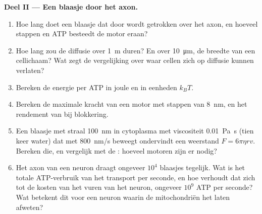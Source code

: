 \begin{problem}
\medskip
\noindent\textbf{Deel II --- Een blaasje door het axon.}
\begin{enumerate}[resume]
  \item Hoe lang doet een blaasje dat door  wordt getrokken over
        het axon, en hoeveel stappen en ATP besteedt de motor eraan?
  \item Hoe lang zou de diffusie over \qty{1}{m} duren? En over
        \qty{10}{\micro m}, de breedte van een cellichaam? Wat zegt de
        vergelijking over waar cellen zich op diffusie kunnen verlaten?
  \item Bereken de energie per ATP in joule en in eenheden $k_{B}T$.
  \item Bereken de maximale kracht van een motor met stappen van
        \qty{8}{nm}, en het rendement van  bij blokkering.
  \item Een blaasje met straal \qty{100}{nm} in cytoplasma met
        viscositeit \qty{0.01}{Pa.s} (tien keer water) dat met
        \qty{800}{nm/s} beweegt ondervindt een weerstand
        $F = 6\pi\eta r v$. Bereken die, en vergelijk met de
        : hoeveel motoren zijn er nodig?
  \item Het axon van een neuron draagt ongeveer $10^{4}$ blaasjes
        tegelijk. Wat is het totale ATP-verbruik van het transport per
        seconde, en hoe verhoudt dat zich tot de kosten van het vuren
        van het neuron, ongeveer $10^{9}$ ATP per seconde? Wat betekent
        dit voor een neuron waarin de mitochondriën het laten afweten?
\end{enumerate}


\end{problem}
